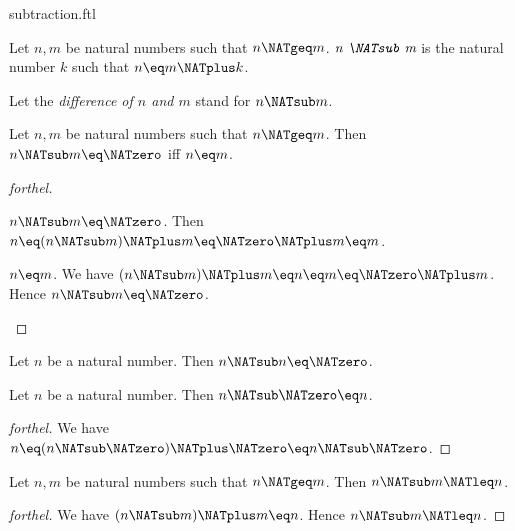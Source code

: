 \documentclass{naproche-library}
\begin{document}
\begin{smodule}[title=Subtraction]{subtraction.ftl}

\begin{definition}[forthel,id=ARITHMETIC_05_8878757276286976]
  Let $n, m$ be natural numbers such that $n \NATgeq m$.
  $\emph{n \NATsub m}$ is the natural number $k$ such that $n \eq m \NATplus k$.

  Let the \emph{difference of $n$ and $m$} stand for $n \NATsub m$.
\end{definition}

\begin{proposition}[forthel,id=ARITHMETIC_05_874271710642176]
  Let $n, m$ be natural numbers such that $n \NATgeq m$.
  Then $n \NATsub m \eq \NATzero$ iff $n \eq m$.
\end{proposition}
\begin{proof}[forthel]
  \begin{case}{$n \NATsub m \eq \NATzero$.}
    Then $n
      \eq (n \NATsub m) \NATplus m
      \eq \NATzero \NATplus m
      \eq m$.
  \end{case}

  \begin{case}{$n \eq m$.}
    We have $(n \NATsub m) \NATplus m
      \eq n
      \eq m
      \eq \NATzero \NATplus m$.
    Hence $n \NATsub m \eq \NATzero$.
  \end{case}
\end{proof}

\begin{corollary}[forthel,id=ARITHMETIC_05_8457713057005568]
  Let $n$ be a natural number.
  Then $n \NATsub n \eq \NATzero$.
\end{corollary}

\begin{proposition}[forthel,id=ARITHMETIC_05_8518521570983936]
  Let $n$ be a natural number.
  Then $n \NATsub \NATzero \eq n$.
\end{proposition}
\begin{proof}[forthel]
  We have $n
    \eq (n \NATsub \NATzero) \NATplus \NATzero
    \eq n \NATsub \NATzero$.
\end{proof}

\begin{proposition}[forthel,id=ARITHMETIC_05_4222566117933056]
  Let $n, m$ be natural numbers such that $n \NATgeq m$.
  Then $n \NATsub m \NATleq n$.
\end{proposition}
\begin{proof}[forthel]
  We have $(n \NATsub m) \NATplus m \eq n$.
  Hence $n \NATsub m \NATleq n$.
\end{proof}


\end{smodule}
\end{document}
